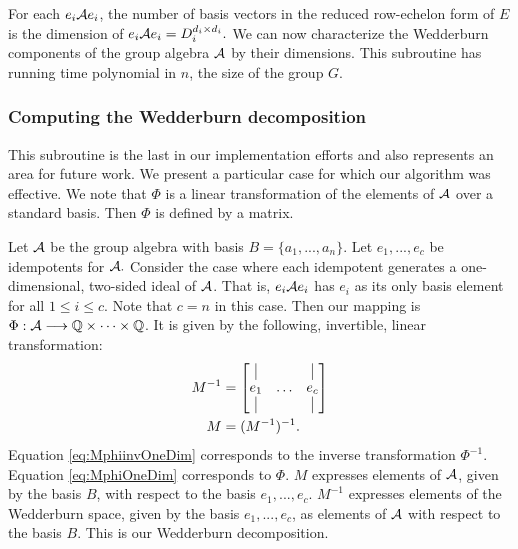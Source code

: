 \documentclass[../thesis.tex]{subfiles}
\begin{document}
For each $e_i\mathcal{A} e_i$, the number of basis vectors in the reduced row-echelon form of $E$ is the dimension of $e_i\mathcal{A} e_i = D_i^{d_i\times d_i}.$ We can now characterize the Wedderburn components of the group algebra $\mathcal{A}$ by their dimensions. This subroutine has running time polynomial in $n$, the size of the group $G.$

\subsubsection{Computing the Wedderburn decomposition}\label{sec:computingphi}
This subroutine is the last in our implementation efforts and also represents an area for future work. We present a particular case for which our algorithm was effective. We note that $\Phi$ is a linear transformation of the elements of $\mathcal{A}$ over a standard basis. Then $\Phi$ is defined by a matrix. 

Let $\mathcal{A}$ be the group algebra with basis $B=\{a_1,...,a_n\}$. Let $e_1,...,e_c$ be idempotents for $\mathcal{A}.$ Consider the case where each idempotent generates a one-dimensional, two-sided ideal of $\mathcal{A}$. That is, $e_i\mathcal{A} e_i$ has $e_i$ as its only basis element for all $1\leq i\leq c.$ Note that $c = n$ in this case. Then our mapping is $\Phi:\mathcal{A}\longrightarrow\mathbb{Q}\times\cdots\times\mathbb{Q}$. It is given by the following, invertible, linear transformation:
\begin{align}
    M^{-1} & = \begin{bmatrix}
        \vline & & \vline\\
        e_1 & \hdots & e_c\\
        \vline & & \vline
    \end{bmatrix}\label{eq:MphiinvOneDim}\\
    M &= (M^{-1})^{-1}.\label{eq:MphiOneDim}
\end{align}
Equation \ref{eq:MphiinvOneDim} corresponds to the inverse transformation $\Phi^{-1}$. Equation \ref{eq:MphiOneDim} corresponds to $\Phi.$ $M$ expresses elements of $\mathcal{A}$, given by the basis $B$, with respect to the basis $e_1,...,e_c.$ $M^{-1}$ expresses elements of the Wedderburn space, given by the basis $e_1,...,e_c$, as elements of $\mathcal{A}$ with respect to the basis $B.$ This is our Wedderburn decomposition.
\end{document}
